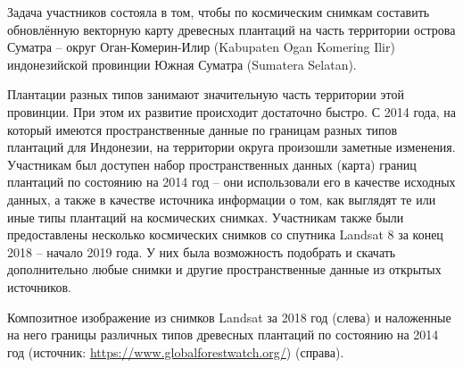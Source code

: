\solutionSection

Задача участников состояла в том, чтобы по космическим снимкам составить обновлённую векторную карту древесных плантаций на часть территории острова Суматра – округ Оган-Комерин-Илир (Kabupaten Ogan Komering Ilir) индонезийской провинции Южная Суматра (Sumatera Selatan).

Плантации разных типов занимают значительную часть территории этой провинции. При этом их развитие происходит достаточно быстро. С 2014 года, на который имеются пространственные данные по границам разных типов плантаций для Индонезии, на территории округа произошли заметные изменения. Участникам был доступен набор пространственных данных (карта) границ плантаций по состоянию на 2014 год – они использовали его в качестве исходных данных, а также в качестве источника информации о том, как выглядят те или иные типы плантаций на космических снимках. Участникам также были предоставлены несколько космических снимков со спутника Landsat 8 за конец 2018 – начало 2019 года. У них была возможность подобрать и скачать дополнительно любые снимки и другие пространственные данные из открытых источников.


\begin{center}
    Композитное изображение из снимков Landsat за 2018 год (слева) и наложенные на него границы различных типов древесных плантаций по состоянию на 2014 год (источник: \url{https://www.globalforestwatch.org/}) (справа).
\end{center}